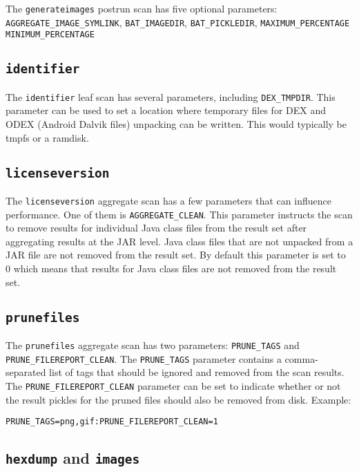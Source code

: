 \documentclass[10pt]{article}
\begin{document}
The \texttt{generateimages} postrun scan has five optional parameters:
\texttt{AGGREGATE\_IMAGE\_SYMLINK}, \texttt{BAT\_IMAGEDIR}, \texttt{BAT\_PICKLEDIR}, \texttt{MAXIMUM\_PERCENTAGE}
\texttt{MINIMUM\_PERCENTAGE}

\subsection{\texttt{identifier}}

The \texttt{identifier} leaf scan has several parameters, including
\texttt{DEX\_TMPDIR}. This parameter can be used to set a location where
temporary files for DEX and ODEX (Android Dalvik files) unpacking can be
written. This would typically be tmpfs or a ramdisk.

\subsection{\texttt{licenseversion}}

The \texttt{licenseversion} aggregate scan has a few parameters that can
influence performance. One of them is \texttt{AGGREGATE\_CLEAN}. This parameter
instructs the scan to remove results for individual Java class files from the
result set after aggregating results at the JAR level. Java class files that
are not unpacked from a JAR file are not removed from the result set. By
default this parameter is set to 0 which means that results for Java class
files are not removed from the result set.

\subsection{\texttt{prunefiles}}

The \texttt{prunefiles} aggregate scan has two parameters: \texttt{PRUNE\_TAGS}
and \texttt{PRUNE\_FILEREPORT\_CLEAN}. The \texttt{PRUNE\_TAGS} parameter
contains a comma-separated list of tags that should be ignored and removed from
the scan results. The \texttt{PRUNE\_FILEREPORT\_CLEAN} parameter can be set to
indicate whether or not the result pickles for the pruned files should also be
removed from disk. Example:

\begin{verbatim}
PRUNE_TAGS=png,gif:PRUNE_FILEREPORT_CLEAN=1
\end{verbatim}

\subsection{\texttt{hexdump} and \texttt{images}}
\end{document}
